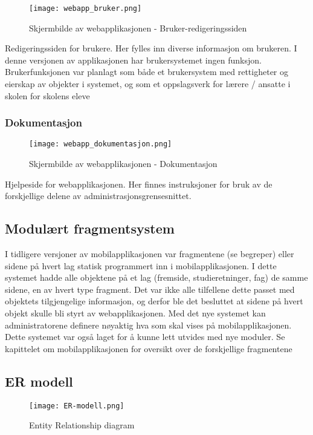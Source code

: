 \documentclass[../main.tex]{subfiles}
\begin{document}
\begin{figure}[H]
  \centering
  \texttt{[image: webapp\_bruker.png]}
  \caption{Skjermbilde av webapplikasjonen - Bruker-redigeringssiden}
\end{figure}

Redigeringssiden for brukere. Her fylles inn diverse informasjon om brukeren. I denne versjonen av applikasjonen har brukersystemet ingen funksjon. Brukerfunksjonen var planlagt som både et brukersystem med rettigheter og eierskap av objekter i systemet, og som et oppslagsverk for lærere / ansatte i skolen for skolens eleve

\subsubsection{Dokumentasjon}

\begin{figure}[H]
  \centering
  \texttt{[image: webapp\_dokumentasjon.png]}
  \caption{Skjermbilde av webapplikasjonen - Dokumentasjon}
\end{figure}

Hjelpeside for webapplikasjonen. Her finnes instruksjoner for bruk av de forskjellige delene av administrasjonsgrensesnittet.


\subsection{Modulært fragmentsystem}

I tidligere versjoner av mobilapplikasjonen var fragmentene (se begreper) eller sidene på hvert lag statisk programmert inn i mobilapplikasjonen. I dette systemet hadde alle objektene på et lag (fremside, studieretninger, fag) de samme sidene, en av hvert type fragment. Det var ikke alle tilfellene dette passet med objektets tilgjengelige informasjon, og derfor ble det besluttet at sidene på hvert objekt skulle bli styrt av webapplikasjonen. Med det nye systemet kan administratorene definere nøyaktig hva som skal vises på mobilapplikasjonen. Dette systemet var også laget for å kunne lett utvides med nye moduler. Se kapittelet om mobilapplikasjonen for oversikt over de forskjellige fragmentene

\subsection{ER modell}

\begin{figure}[H]
  \centering
  \texttt{[image: ER-modell.png]}
  \caption{Entity Relationship diagram}
\end{figure}
\end{document}
